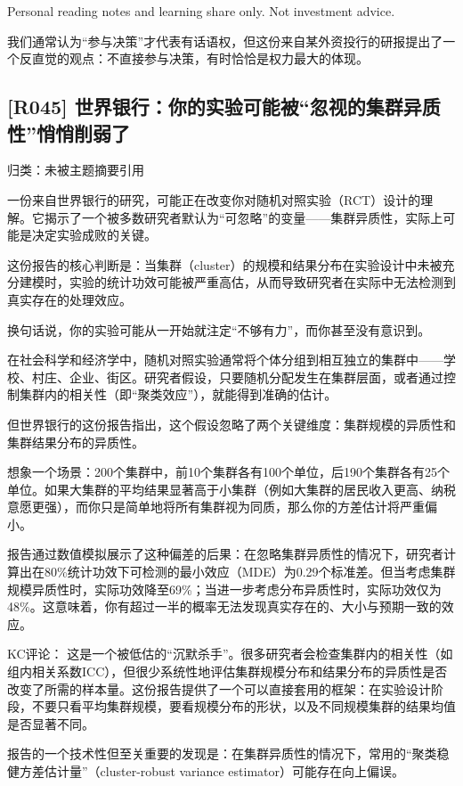 \documentclass[11pt]{ctexart}
\begin{document}
Personal reading notes and learning share only. Not investment advice.

我们通常认为“参与决策”才代表有话语权，但这份来自某外资投行的研报提出了一个反直觉的观点：不直接参与决策，有时恰恰是权力最大的体现。

\subsection{[R045] 世界银行：你的实验可能被“忽视的集群异质性”悄悄削弱了}
{\small\color{refgray}归类：未被主题摘要引用}

一份来自世界银行的研究，可能正在改变你对随机对照实验（RCT）设计的理解。它揭示了一个被多数研究者默认为“可忽略”的变量——集群异质性，实际上可能是决定实验成败的关键。

这份报告的核心判断是：当集群（cluster）的规模和结果分布在实验设计中未被充分建模时，实验的统计功效可能被严重高估，从而导致研究者在实际中无法检测到真实存在的处理效应。

换句话说，你的实验可能从一开始就注定“不够有力”，而你甚至没有意识到。

在社会科学和经济学中，随机对照实验通常将个体分组到相互独立的集群中——学校、村庄、企业、街区。研究者假设，只要随机分配发生在集群层面，或者通过控制集群内的相关性（即“聚类效应”），就能得到准确的估计。

但世界银行的这份报告指出，这个假设忽略了两个关键维度：集群规模的异质性和集群结果分布的异质性。

想象一个场景：200个集群中，前10个集群各有100个单位，后190个集群各有25个单位。如果大集群的平均结果显著高于小集群（例如大集群的居民收入更高、纳税意愿更强），而你只是简单地将所有集群视为同质，那么你的方差估计将严重偏小。

报告通过数值模拟展示了这种偏差的后果：在忽略集群异质性的情况下，研究者计算出在80\%统计功效下可检测的最小效应（MDE）为0.29个标准差。但当考虑集群规模异质性时，实际功效降至69\%；当进一步考虑分布异质性时，实际功效仅为48\%。这意味着，你有超过一半的概率无法发现真实存在的、大小与预期一致的效应。

KC评论： 这是一个被低估的“沉默杀手”。很多研究者会检查集群内的相关性（如组内相关系数ICC），但很少系统性地评估集群规模分布和结果分布的异质性是否改变了所需的样本量。这份报告提供了一个可以直接套用的框架：在实验设计阶段，不要只看平均集群规模，要看规模分布的形状，以及不同规模集群的结果均值是否显著不同。

报告的一个技术性但至关重要的发现是：在集群异质性的情况下，常用的“聚类稳健方差估计量”（cluster-robust variance estimator）可能存在向上偏误。
\end{document}
